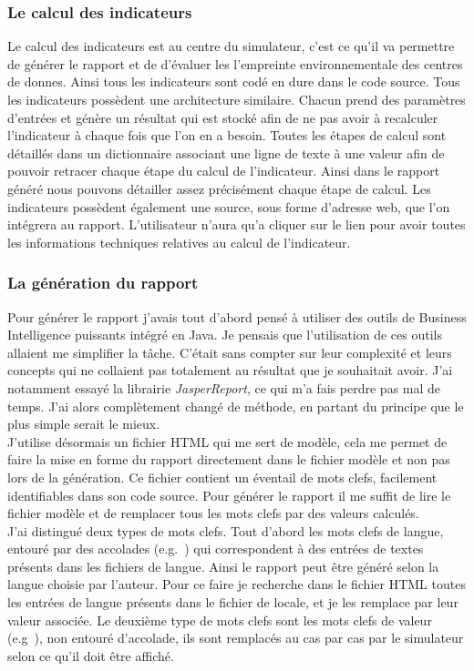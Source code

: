 \subsubsection{Le calcul des indicateurs}
Le calcul des indicateurs est au centre du simulateur, c'est ce qu'il va permettre de générer le rapport et de d'évaluer les l'empreinte environnementale des centres de donnes. Ainsi tous les indicateurs sont codé \og en dure \fg{} dans le code source. Tous les indicateurs possèdent une architecture similaire. Chacun prend des paramètres d'entrées et génère un résultat qui est stocké afin de ne pas avoir à recalculer l'indicateur à chaque fois que l'on en a besoin. Toutes les étapes de calcul sont détaillés dans un dictionnaire associant une ligne de texte à une valeur afin de pouvoir retracer chaque étape du calcul de l'indicateur. Ainsi dans le rapport généré nous pouvons détailler assez précisément chaque étape de calcul. Les indicateurs possèdent également une source, sous forme d'adresse web, que l'on intégrera au rapport. L'utilisateur n'aura qu'a cliquer sur le lien pour avoir toutes les informations techniques relatives au calcul de l'indicateur.

\subsubsection{La génération du rapport}
Pour générer le rapport j'avais tout d'abord pensé à utiliser des outils de Business Intelligence puissants intégré en Java. Je pensais que l'utilisation de ces outils allaient me simplifier la tâche. C'était sans compter sur leur complexité et leurs concepts qui ne collaient pas totalement au résultat que je souhaitait avoir. J'ai notamment essayé la librairie \emph{JasperReport}, ce qui m'a fais perdre pas mal de temps.
J'ai alors complètement changé de méthode, en partant du principe que le plus simple serait le mieux.\\
J'utilise désormais un fichier HTML qui me sert de modèle, cela me permet de faire la mise en forme du rapport directement dans le fichier modèle et non pas lors de la génération. Ce fichier contient un éventail de mots clefs, facilement identifiables dans son code source. Pour générer le rapport il me suffit de lire le fichier modèle et de remplacer tous les mots clefs par des valeurs calculés.\\
J'ai distingué deux types de mots clefs. Tout d'abord les mots clefs de langue, entouré par des accolades (e.g.\ ) qui correspondent à des entrées de textes présents dans les fichiers de langue. Ainsi le rapport peut être généré selon la langue choisie par l'auteur. Pour ce faire je recherche dans le fichier HTML toutes les entrées de langue présents dans le fichier de locale, et je les remplace par leur valeur associée. Le deuxième type de mots clefs sont les mots clefs de valeur (e.g\ ), non entouré d'accolade, ils sont remplacés au cas par cas par le simulateur selon ce qu'il doit être affiché.\\

